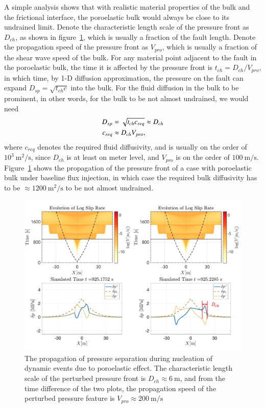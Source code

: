 A simple analysis shows that with realistic material properties of the bulk and the frictional interface, 
the poroelastic bulk would always be close to its undrained limit. 
Denote the characteristic length scale of the pressure front as $D_{ch}$, 
as shown in figure~\ref{fig:CloseTpUndrained}, 
which is usually a fraction of the fault length. 
Denote the propagation speed of the pressure front as $V_{pro}$, 
which is usually a fraction of the shear wave speed of the bulk. 
For any material point adjacent to the fault in the poroelastic bulk, 
the time it is affected by the pressure front is $t_{ch} = D_{ch} / V_{pro}$, 
in which time, 
by 1-D diffusion approximation, 
the pressure on the fault can expand $D_{sp} = \sqrt{t_{ch}c}$ into the bulk. 
For the fluid diffusion in the bulk to be prominent, 
in other words, 
for the bulk to be not almost undrained, 
we would need 
\begin{align}
    D_{sp} &= \sqrt{t_{ch} c_{req}} \approx D_{ch} \notag \\
    c_{req} &\approx D_{ch} V_{pro} \label{eq:estimateC}, 
\end{align}
where $c_{req}$ denotes the required fluid diffusivity, 
and is usually on the order of $10^{3}\ \mathrm{m^2/s}$, 
since $D_{ch}$ is at least on meter level, 
and $V_{pro}$ is on the order of $100\ \mathrm{m/s}$. 
Figure~\ref{fig:CloseTpUndrained} shows the propagation of the pressure front of a case with poroelastic bulk under baseline flux injection, 
in which case the required bulk diffusivity has to be $\approx 1200\ \mathrm{m^2/s}$ to be not almost undrained. 
\begin{figure}[htbp]
    \centering
    \includegraphics[width=1.0\textwidth]{figures/CloseToUndrained.pdf}
    \caption{The propagation of pressure separation during nucleation of dynamic events due to poroelastic effect. 
    The characteristic length scale of the perturbed pressure front is $D_{ch} \approx 6\ \mathrm{m}$, 
    and from the time difference of the two plots, 
    the propagation speed of the perturbed pressure feature is $V_{pro} \approx 200\ \mathrm{m/s}$
    }
    \label{fig:CloseTpUndrained}
\end{figure}

